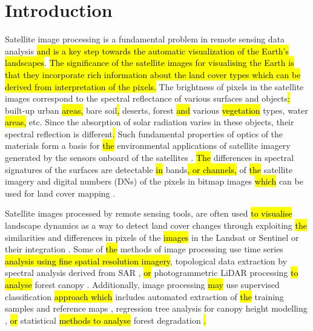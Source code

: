 \documentclass[applsci,article,submit,pdftex,moreauthors]{Definitions/mdpi}
\begin{document}
\section{Introduction}
Satellite image processing is a fundamental problem in remote sensing data analysis \hl{and is a key step towards the automatic visualization of the Earth's landscapes}. \hl{The significance of the satellite images for visualising the Earth is that they incorporate rich information about the land cover types which can be derived from interpretation of the pixels.} The brightness of pixels in the satellite images correspond to the spectral reflectance of various surfaces and objects\hl{: }built-up urban \hl{areas,} bare soil\hl{, }deserts, forest \hl{and} various \hl{vegetation} types, water\hl{ areas, }etc. Since the absorption of\hl{ }solar radiation varies in these objects, their spectral reflection is different\hl{. }Such fundamental properties of optics of the\hl{ }materials form a basis for \hl{the }environmental applications of satellite imagery generated by the sensors\hl{ }onboard of the\hl{ }satellites \cite{Lillesand}. \hl{The} differences in\hl{ }spectral signatures of the\hl{ }surfaces are detectable\hl{ in }bands\hl{, or channels,} of \hl{the} satellite imagery and digital numbers (DNs) of the pixels in\hl{ }bitmap images \hl{which} can be used for land cover mapping \cite{Manakos}. 

Satellite images processed by remote sensing\hl{ }tools, are often used \hl{to visualise} landscape dynamics as a way to detect land cover changes through exploiting\hl{ the }similarities and differences in pixels of the \hl{images } in the Landsat \cite{SIKUZANI2020e01333,DUVEILLER20081969} or Sentinel\hl{ }\cite{9554698,Lemenkova202021,9553905} or their integration \cite{ZHANG2021112470,CHEN2021102386}. Some of \hl{the }methods of image processing use time series \hl{analysis using fine spatial resolution imagery}\cite{7326202,6352722}, topological data extraction by spectral analysis derived from\hl{ }SAR\hl{ }\cite{1027205,520569}, \hl{or} photogrammetric LiDAR\hl{ }processing\hl{ to analyse }forest canopy \cite{rs13183777}. Additionally,\hl{ }image processing \hl{may} use supervised classification \hl{approach which} includes\hl{ }automated extraction of \hl{the} training samples and\hl{ }reference maps \cite{rs12172705}, regression tree analysis for\hl{ }canopy height modelling\hl{ }\cite{HANSEN2016221}, \hl{or} statistical \hl{methods to analyse} forest degradation \cite{7326141}\hl{.}
\end{document}

